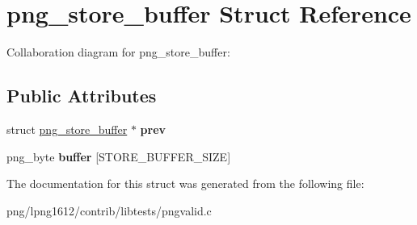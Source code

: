 \hypertarget{structpng__store__buffer}{\section{png\+\_\+store\+\_\+buffer Struct Reference}
\label{structpng__store__buffer}
}


Collaboration diagram for png\+\_\+store\+\_\+buffer\+:
\subsection*{Public Attributes}
\begin{DoxyCompactItemize}
\item 
\hypertarget{structpng__store__buffer_a812b4b270d31dd91a9c216d5d70567c1}{struct \hyperlink{structpng__store__buffer}{png\+\_\+store\+\_\+buffer} $\ast$ {\bfseries prev}}\label{structpng__store__buffer_a812b4b270d31dd91a9c216d5d70567c1}

\item 
\hypertarget{structpng__store__buffer_a11385f933c90a83bf05685fa8ddcba49}{png\+\_\+byte {\bfseries buffer} \mbox{[}S\+T\+O\+R\+E\+\_\+\+B\+U\+F\+F\+E\+R\+\_\+\+S\+I\+Z\+E\mbox{]}}\label{structpng__store__buffer_a11385f933c90a83bf05685fa8ddcba49}

\end{DoxyCompactItemize}


The documentation for this struct was generated from the following file\+:\begin{DoxyCompactItemize}
\item 
png/lpng1612/contrib/libtests/pngvalid.\+c\end{DoxyCompactItemize}
